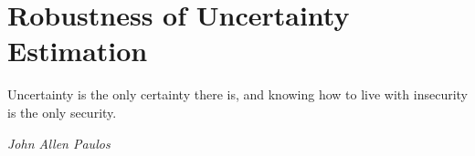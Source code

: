 \chapter{Robustness of Uncertainty Estimation}
\label{chap:robustness}

\epigraph{Uncertainty is the only certainty there is, and knowing how to live with insecurity is the only security.}{\textit{John Allen Paulos}}









